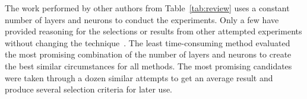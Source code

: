 %
The work performed by other authors from Table~\ref{tab:review} uses a constant number of layers and neurons to conduct the experiments.
Only a few have provided reasoning for the selections or results from other attempted experiments without changing the technique~\cite{jiao_gru-rnn_2020,mamo_long_2020}.
The least time-consuming method evaluated the most promising combination of the number of layers and neurons to create the best similar circumstances for all methods.
The most promising candidates were taken through a dozen similar attempts to get an average result and produce several selection criteria for later use.
